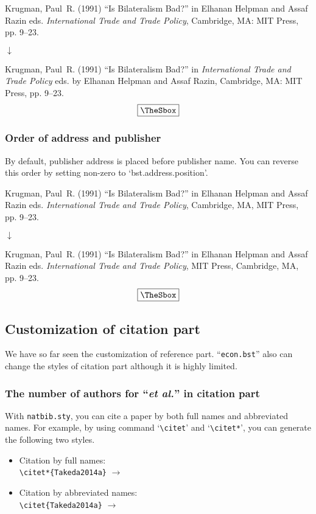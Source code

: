 \documentclass[10pt]{article}
\newenvironment{Frame}%
{\setlength{\fboxsep}{15pt}
\setlength{\mylength}{\linewidth}%
\addtolength{\mylength}{-2\fboxsep}%
\addtolength{\mylength}{-2\fboxrule}%
\Sbox
\minipage{\mylength}%
\setlength{\abovedisplayskip}{0pt}%
\setlength{\belowdisplayskip}{0pt}%
}%
{\endminipage\endSbox
\[\fbox{\TheSbox}\]}
\begin{document}
\begin{Frame}
Krugman, Paul~R. (1991) ``Is Bilateralism Bad?'' in Elhanan Helpman and Assaf
  Razin eds.  {\it International Trade and Trade Policy}, Cambridge, MA: MIT
  Press, pp. 9--23.
\begin{center}
 $\downarrow$
\end{center} 
Krugman, Paul~R. (1991) ``Is Bilateralism Bad?'' in  {\it International Trade
and Trade Policy}  eds. by Elhanan Helpman and Assaf Razin, Cambridge, MA:
MIT Press, pp. 9--23.
\end{Frame}

\subsubsection{Order of address and publisher}

By default, publisher address is placed before publisher name.  You can
reverse this order by setting non-zero to `bst.address.position'.
\begin{Frame}
Krugman, Paul~R. (1991) ``Is Bilateralism Bad?'' in Elhanan Helpman and
  Assaf Razin eds.  {\it International Trade and Trade Policy},
  Cambridge, MA, MIT Press, pp. 9--23.
\begin{center}
 $\downarrow$
\end{center} 
Krugman, Paul~R. (1991) ``Is Bilateralism Bad?'' in Elhanan Helpman and Assaf
  Razin eds.   {\it International Trade and Trade Policy}, MIT Press,
  Cambridge, MA, pp. 9--23.
\end{Frame}

\subsection{Customization of citation part}

We have so far seen the customization of reference part. ``\texttt{econ.bst}''
also can change the styles of citation part although it is highly limited.

\subsubsection{The number of authors for ``\textit{et al.}'' in citation part}

With \texttt{natbib.sty}, you can cite a paper by both full names and
abbreviated names. For example, by using command `\verb|\citet|' and
`\verb|\citet*|', you can generate the following two styles.
\begin{itemize}
 \item Citation by full names: \\
       \verb|\citet*{Takeda2014a}| $\longrightarrow$ \citet*{Takeda2014a}
 \item Citation by abbreviated names: \\
       \verb|\citet{Takeda2014a}| $\longrightarrow$ \citet{Takeda2014a}
\end{itemize}
\end{document}
